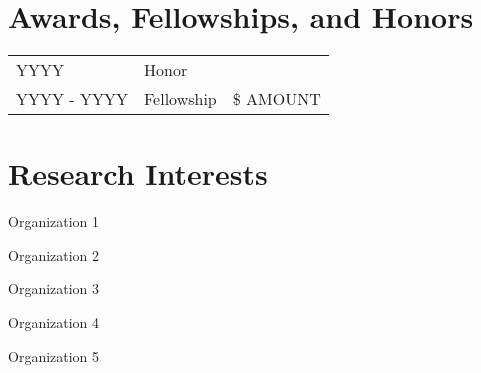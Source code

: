 \documentclass[11pt]{article}
\newcommand{\RR}{\raggedright\arraybackslash} %
\newcommand{\RL}{\raggedleft\arraybackslash}  %
\begin{document}

\section*{Awards, Fellowships, and Honors}
\begin{tabularx}{\linewidth}{>{\RR}p{1in}>{\RR}X>{\RL}p{.85in}}
YYYY & Honor \\
YYYY - YYYY & Fellowship & \$ AMOUNT \\ %

\end{tabularx}



\section*{Research Interests}

\hspace{-.25em}\begin{itemize*}[itemjoin={{ $\bullet$}}, label={}]
\item Organization 1
\item Organization 2
\item Organization 3
\item Organization 4
\item Organization 5
\end{itemize*}

\end{document}

